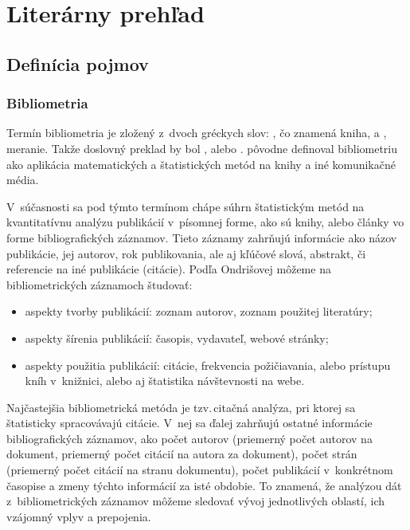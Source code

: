 \chapter{Literárny prehľad}

\section{Definícia pojmov}

\subsection{Bibliometria}

Termín bibliometria je zložený z~dvoch gréckych slov:
, čo znamená kniha, a
, meranie.  Takže doslovný
preklad by bol , alebo .
\citet{Pritchard1969} pôvodne definoval bibliometriu ako aplikácia
matematických a štatistických metód na knihy a iné komunikačné média.

V~súčasnosti sa pod týmto termínom chápe súhrn štatistickým metód na
kvantitatívnu analýzu publikácií v~písomnej forme, ako sú knihy, alebo články
vo forme bibliografických záznamov.  Tieto záznamy zahrňujú informácie ako
názov publikácie, jej autorov, rok publikovania, ale aj kľúčové slová,
abstrakt, či referencie na iné publikácie (citácie).  Podľa Ondrišovej
\citeyearpar{Ondrisova2011} môžeme na bibliometrických záznamoch študovať:

\begin{itemize}
\item aspekty tvorby publikácií:  zoznam autorov, zoznam použitej literatúry;
\item aspekty šírenia publikácií:  časopis, vydavateľ, webové stránky;
\item aspekty použitia publikácií:  citácie, frekvencia  požičiavania, alebo
    prístupu kníh v~knižnici, alebo aj štatistika návštevnosti na webe.

\end{itemize}

Najčastejšia bibliometrická metóda je tzv.\,citačná analýza,  pri ktorej sa štatisticky spracovávajú citácie.  V~nej sa ďalej
zahrňujú ostatné informácie bibliografických záznamov, ako počet autorov
(priemerný počet autorov na dokument, priemerný počet citácií na autora za
dokument), počet strán (priemerný počet citácií na stranu dokumentu), počet
publikácií v~konkrétnom časopise a zmeny týchto informácií za isté obdobie.  To
znamená, že analýzou dát z~bibliometrických záznamov môžeme sledovať vývoj
jednotlivých oblastí, ich vzájomný vplyv a prepojenia.

